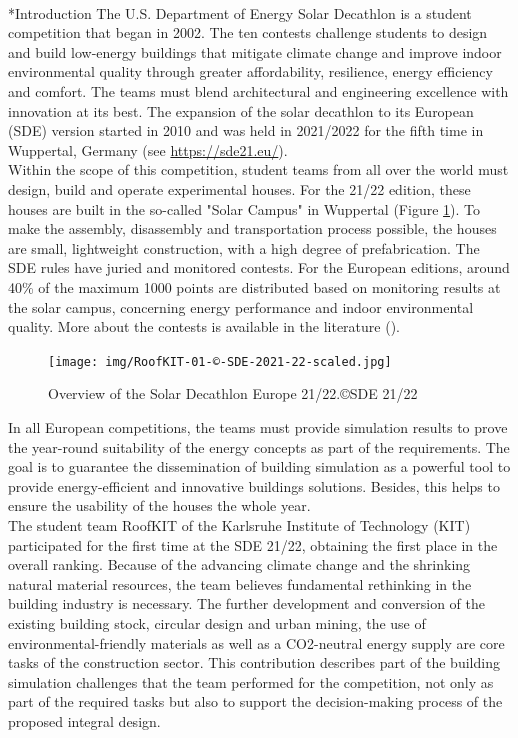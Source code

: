 \documentclass[twocolumn, a4paper,10pt]{article}
\makeatletter
\renewcommand\section{\@startsection{section}{1}{\z@}{3pt}{3pt}{\normalfont\large\bfseries}}
\makeatother
\begin{document}
\section*{Introduction}
The U.S. Department of Energy\textsuperscript{\textregistered} Solar Decathlon is a student competition that began in 2002. The ten contests challenge students to design and build low-energy buildings that mitigate climate change and improve indoor environmental quality through greater affordability, resilience, energy efficiency and comfort. The teams must blend architectural and engineering excellence with innovation at its best. The expansion of the solar decathlon to its European (SDE) version started in 2010 and was held in 2021/2022 for the fifth time in Wuppertal, Germany (see \textcolor{blue}{\url{https://sde21.eu/}}).\\
Within the scope of this competition, student teams from all over the world must design, build and operate experimental houses. For the 21/22 edition, these houses are built in the so-called "Solar Campus" in Wuppertal (Figure \ref{fig:SDE}). To make the assembly, disassembly and transportation process possible, the houses are small, lightweight construction, with a high degree of prefabrication. The SDE rules have juried and monitored contests. For the European editions, around 40\% of the maximum 1000 points are distributed based on monitoring results at the solar campus, concerning energy performance and indoor environmental quality. More about the contests is available in the literature (\citet{voss2021}).

\begin{figure}[H]
\centering
\texttt{[image: img/RoofKIT-01-©-SDE-2021-22-scaled.jpg]}
\vspace{2pt} 
\caption{Overview of the Solar Decathlon Europe 21/22.\copyright SDE 21/22}
\label{fig:SDE}
\end{figure}
\vspace{-2pt}

In all European competitions, the teams must provide simulation results to prove the year-round suitability of the energy concepts as part of the requirements. The goal is to guarantee the dissemination of building simulation as a powerful tool to provide energy-efficient and innovative buildings solutions. Besides, this helps to ensure the usability of the houses the whole year. \\
The student team RoofKIT of the Karlsruhe Institute of Technology (KIT) participated for the first time at the SDE 21/22, obtaining the first place in the overall ranking. Because of the advancing climate change and the shrinking natural material resources, the team believes fundamental rethinking in the building industry is necessary. The further development and conversion of the existing building stock, circular design and urban mining, the use of environmental-friendly materials as well as a CO2-neutral energy supply are core tasks of the construction sector. This contribution describes part of the building simulation challenges that the team performed for the competition, not only as part of the required tasks but also to support the decision-making process of the proposed integral design.
\end{document}
